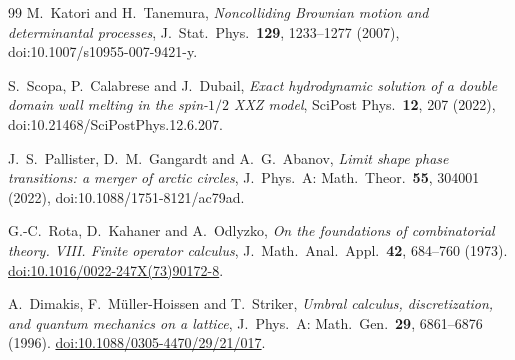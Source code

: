 \documentclass[11pt]{article}
\numberwithin{equation}{section}
\newcommand{\1}{\mathbf 1}
\begin{document}
\begin{thebibliography}{99}
M.~Katori and H.~Tanemura,
\emph{Noncolliding Brownian motion and determinantal processes},
J.~Stat.~Phys.~\textbf{129}, 1233--1277 (2007),
doi:10.1007/s10955-007-9421-y.

S.~Scopa, P.~Calabrese and J.~Dubail,
\emph{Exact hydrodynamic solution of a double domain wall melting in the
spin-$1/2$ XXZ model},
SciPost Phys.~\textbf{12}, 207 (2022),
doi:10.21468/SciPostPhys.12.6.207.

J.~S.~Pallister, D.~M.~Gangardt and A.~G.~Abanov,
\emph{Limit shape phase transitions: a merger of arctic circles},
J.~Phys.~A: Math.~Theor.~\textbf{55}, 304001 (2022),
doi:10.1088/1751-8121/ac79ad.

G.-C.~Rota, D.~Kahaner and A.~Odlyzko,
\emph{On the foundations of combinatorial theory. VIII. Finite operator
calculus},
J.~Math.~Anal.~Appl.~\textbf{42}, 684--760 (1973).
\href{https://doi.org/10.1016/0022-247X(73)90172-8}
{doi:10.1016/0022-247X(73)90172-8}.

A.~Dimakis, F.~M\"uller-Hoissen and T.~Striker,
\emph{Umbral calculus, discretization, and quantum mechanics on a lattice},
J.~Phys.~A: Math.~Gen.~\textbf{29}, 6861--6876 (1996).
\href{https://doi.org/10.1088/0305-4470/29/21/017}
{doi:10.1088/0305-4470/29/21/017}.
\end{thebibliography}
\end{document}
